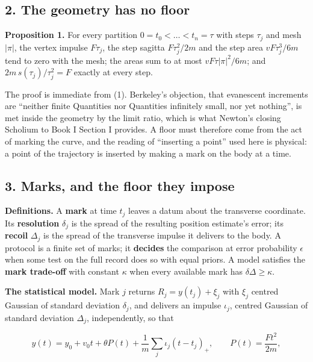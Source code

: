 \documentclass[11pt,a4paper]{article}
\begin{document}
\hypertarget{the-geometry-has-no-floor}{%
\subsection{2. The geometry has no
floor}\label{the-geometry-has-no-floor}}

\textbf{Proposition 1.} For every partition \(0=t_0<\dots<t_n=\tau\)
with steps \(\tau_j\) and mesh \(|\pi|\), the vertex impulse
\(F\tau_j\), the step sagitta \(F\tau_j^2/2m\) and the step area
\(vF\tau_j^3/6m\) tend to zero with the mesh; the areas sum to at most
\(vF\tau|\pi|^2/6m\); and \(2m\,s(\tau_j)/\tau_j^2=F\) exactly at every
step.

The proof is immediate from (1). Berkeley's objection, that evanescent
increments are ``neither finite Quantities nor Quantities infinitely
small, nor yet nothing'', is met inside the geometry by the limit ratio,
which is what Newton's closing Scholium to Book I Section I provides. A
floor must therefore come from the act of marking the curve, and the
reading of ``inserting a point'' used here is physical: a point of the
trajectory is inserted by making a mark on the body at a time.

\hypertarget{marks-and-the-floor-they-impose}{%
\subsection{3. Marks, and the floor they
impose}\label{marks-and-the-floor-they-impose}}

\textbf{Definitions.} A \textbf{mark} at time \(t_j\) leaves a datum
about the transverse coordinate. Its \textbf{resolution} \(\delta_j\) is
the spread of the resulting position estimate's error; its
\textbf{recoil} \(\Delta_j\) is the spread of the transverse impulse it
delivers to the body. A protocol is a finite set of marks; it
\textbf{decides} the comparison at error probability \(\epsilon\) when
some test on the full record does so with equal priors. A model
satisfies the \textbf{mark trade-off} with constant \(\kappa\) when
every available mark has \(\delta\Delta\ge\kappa\).

\textbf{The statistical model.} Mark \(j\) returns \(R_j=y(t_j)+\xi_j\)
with \(\xi_j\) centred Gaussian of standard deviation \(\delta_j\), and
delivers an impulse \(\iota_j\), centred Gaussian of standard deviation
\(\Delta_j\), independently, so that

\[y(t)=y_0+v_0t+\theta P(t)+\frac1m\sum_j\iota_j(t-t_j)_+,\qquad
P(t)=\frac{Ft^2}{2m},\]
\end{document}

